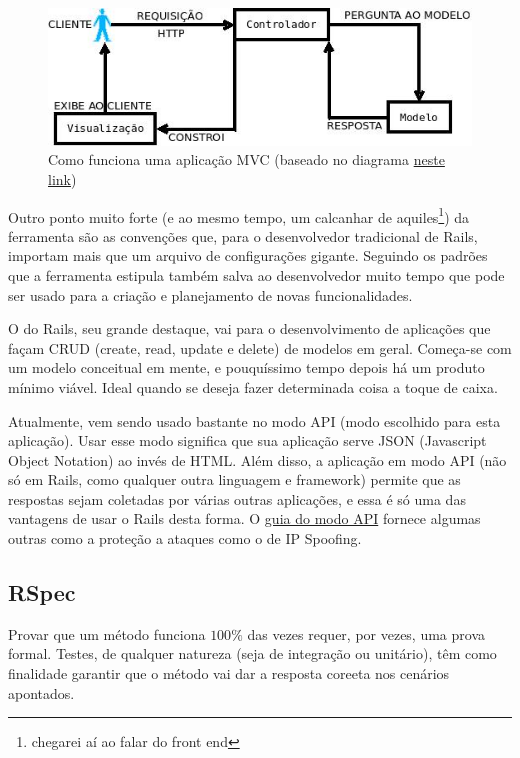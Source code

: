 \begin{figure}[htb]
    \centering
    \includegraphics[width=.7\textwidth]{figuras/mvc.jpeg}
    \caption{Como funciona uma aplicação MVC (baseado no diagrama \href{https://blog.cloudboost.io/what-is-model-view-controller-124a9942246}{neste link})}
    \label{fig:mvc}
\end{figure}

Outro ponto muito forte (e ao mesmo tempo, um calcanhar de aquiles\footnote{chegarei aí ao falar
do front end}) da ferramenta são as convenções que, para o desenvolvedor tradicional de Rails,
importam mais que um arquivo de configurações gigante. Seguindo os padrões que a ferramenta estipula
também salva ao desenvolvedor muito tempo que pode ser usado para a criação e planejamento de novas
funcionalidades.

O  do Rails, seu grande destaque, vai para o desenvolvimento de aplicações que façam
CRUD (create, read, update e delete) de modelos em geral. Começa-se com um modelo conceitual em mente,
e pouquíssimo tempo depois há um produto mínimo viável. Ideal quando se deseja fazer determinada coisa
a toque de caixa.

Atualmente, vem sendo usado bastante no modo API (modo escolhido para esta aplicação). Usar esse
modo significa que sua aplicação serve JSON (Javascript Object Notation) ao invés de HTML. Além
disso, a aplicação em modo API (não só em Rails, como qualquer outra linguagem e framework) permite
que as respostas sejam coletadas por várias outras aplicações, e essa é só uma das vantagens de usar
o Rails desta forma. O \href{https://edgeguides.rubyonrails.org/api_app.html}{guia do modo API}
fornece algumas outras como a proteção a ataques como o de IP Spoofing.

\subsection{RSpec}
\label{subsec:rspec}

Provar que um método funciona $100\%$ das vezes requer, por vezes, uma prova
formal. Testes, de qualquer natureza (seja de integração ou unitário), têm como
finalidade garantir que o método vai dar a resposta coreeta nos cenários apontados.

